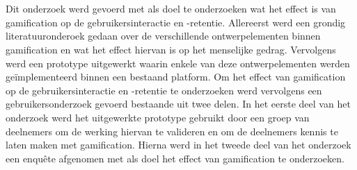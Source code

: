 
%
%

%



\chapter*{}

Dit onderzoek werd gevoerd met als doel te onderzoeken wat het effect is van gamification op de gebruikersinteractie en -retentie. Allereerst werd een grondig literatuuronderoek gedaan over de verschillende ontwerpelementen binnen gamification en wat het effect hiervan is op het menselijke gedrag. Vervolgens werd een prototype uitgewerkt waarin enkele van deze ontwerpelementen werden geïmplementeerd binnen een bestaand platform. Om het effect van gamification op de gebruikersinteractie en -retentie te onderzoeken werd vervolgens een gebruikersonderzoek gevoerd bestaande uit twee delen. In het eerste deel van het onderzoek werd het uitgewerkte prototype gebruikt door een groep van deelnemers om de werking hiervan te valideren en om de deelnemers kennis te laten maken met gamification. Hierna werd in het tweede deel van het onderzoek een enquête afgenomen met als doel het effect van gamification te onderzoeken.